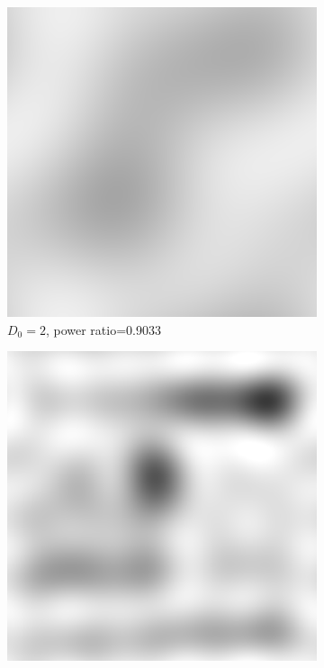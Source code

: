 \begin{figure}[h!]
	\centering
	\begin{subfigure}[b]{0.45\linewidth}
		\includegraphics[width=\linewidth]{myfigure/p3/ILPF_2.png}
		\caption{$D_0=2$, power ratio=0.9033}
		\label{fig:ILPF_2}
	\end{subfigure}
	\begin{subfigure}[b]{0.45\linewidth}
		\includegraphics[width=\linewidth]{myfigure/p3/ILPF_5.png}

\end{subfigure}
\end{figure}
